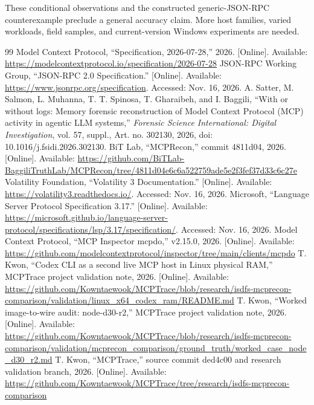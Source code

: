 \documentclass[conference,10pt]{IEEEtran}
\begin{document}
These conditional observations and the constructed generic-JSON-RPC counterexample preclude a general accuracy claim. More host families, varied workloads, field samples, and current-version Windows experiments are needed.

\begin{thebibliography}{99}
 Model Context Protocol, ``Specification, 2026-07-28,'' 2026. [Online]. Available: \url{https://modelcontextprotocol.io/specification/2026-07-28}
 JSON-RPC Working Group, ``JSON-RPC 2.0 Specification.'' [Online]. Available: \url{https://www.jsonrpc.org/specification}. Accessed: Nov. 16, 2026.
 A. Satter, M. Salmon, L. Muhanna, T. T. Spinosa, T. Gharaibeh, and I. Baggili, ``With or without logs: Memory forensic reconstruction of Model Context Protocol (MCP) activity in agentic LLM systems,'' \emph{Forensic Science International: Digital Investigation}, vol. 57, suppl., Art. no. 302130, 2026, doi: 10.1016/j.fsidi.2026.302130.
 BiT Lab, ``MCPRecon,'' commit 4811d04, 2026. [Online]. Available: \url{https://github.com/BiTLab-BaggiliTruthLab/MCPRecon/tree/4811d04e6c6a522759ade5e2f3fef37d33c6c27e}
 Volatility Foundation, ``Volatility 3 Documentation.'' [Online]. Available: \url{https://volatility3.readthedocs.io/}. Accessed: Nov. 16, 2026.
 Microsoft, ``Language Server Protocol Specification 3.17.'' [Online]. Available: \url{https://microsoft.github.io/language-server-protocol/specifications/lsp/3.17/specification/}. Accessed: Nov. 16, 2026.
 Model Context Protocol, ``MCP Inspector mcpdo,'' v2.15.0, 2026. [Online]. Available: \url{https://github.com/modelcontextprotocol/inspector/tree/main/clients/mcpdo}
 T. Kwon, ``Codex CLI as a second live MCP host in Linux physical RAM,'' MCPTrace project validation note, 2026. [Online]. Available: \url{https://github.com/Kowntaewook/MCPTrace/blob/research/isdfs-mcprecon-comparison/validation/linux_x64_codex_ram/README.md}
 T. Kwon, ``Worked image-to-wire audit: node-d30-r2,'' MCPTrace project validation note, 2026. [Online]. Available: \url{https://github.com/Kowntaewook/MCPTrace/blob/research/isdfs-mcprecon-comparison/validation/mcprecon_comparison/ground_truth/worked_case_node_d30_r2.md}
 T. Kwon, ``MCPTrace,'' source commit ded4c00 and research validation branch, 2026. [Online]. Available: \url{https://github.com/Kowntaewook/MCPTrace/tree/research/isdfs-mcprecon-comparison}
\end{thebibliography}
\end{document}
